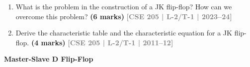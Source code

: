 \documentclass[12pt,a3paper]{article}
\newcommand{\yr}[1]{\hfill\textcolor{gray}{\small\textbf{[#1]}}}
\newcommand{\mk}[1]{\textcolor{orange!70!black}{\small\textbf{(#1 marks)}}}
\newcommand{\subtopic}[2]{%
  \vspace{10pt}
  \noindent\begin{tcolorbox}[colback=#1!8,colframe=#1,boxrule=0.6pt,arc=4pt,
    left=6pt,right=6pt,top=4pt,bottom=4pt]
    \small\bfseries\textcolor{#1}{#2}
  \end{tcolorbox}
  \vspace{2pt}
}
\begin{document}
\begin{enumerate}

\item What is the problem in the construction of a JK flip-flop? How can we overcome this problem?
\mk{6} \yr{CSE 205 | L-2/T-1 | 2023--24}

\item Derive the characteristic table and the characteristic equation for a JK flip-flop.
\mk{4} \yr{CSE 205 | L-2/T-1 | 2011--12}

\end{enumerate}

\subtopic{cE}{Master-Slave D Flip-Flop}
\label{sub:s5-master-slave}
\end{document}
